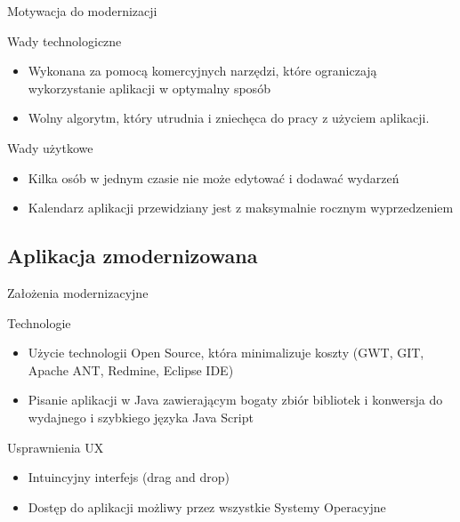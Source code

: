 \begin{frame}{Motywacja do modernizacji}
    \begin{block}{Wady technologiczne}
        \begin{itemize}
        \item Wykonana za pomocą komercyjnych narzędzi, które ograniczają wykorzystanie aplikacji w optymalny sposób

        \item Wolny algorytm, który utrudnia i zniechęca do pracy z
użyciem aplikacji.

        \end{itemize}
    \end{block}

    \begin{block}{Wady użytkowe}
        \begin{itemize}
        \item Kilka osób w jednym czasie nie może edytować i dodawać
wydarzeń

        \item Kalendarz aplikacji przewidziany jest z maksymalnie
rocznym wyprzedzeniem

        \end{itemize}
    \end{block}
\end{frame}

\subsection{Aplikacja zmodernizowana}

\begin{frame}{Założenia modernizacyjne}
    \begin{block}{Technologie}
        \begin{itemize}
        \item Użycie technologii Open Source, która minimalizuje koszty (GWT, GIT, Apache ANT, Redmine, Eclipse IDE)
        \item Pisanie aplikacji w Java zawierającym bogaty zbiór bibliotek i konwersja do wydajnego i szybkiego języka Java Script
        \end{itemize}
    \end{block}

    \begin{block}{Usprawnienia UX}
        \begin{itemize}
        \item Intuincyjny interfejs (drag and drop)
        \item Dostęp do aplikacji możliwy przez wszystkie Systemy Operacyjne
        \end{itemize}
    \end{block}
\end{frame}

